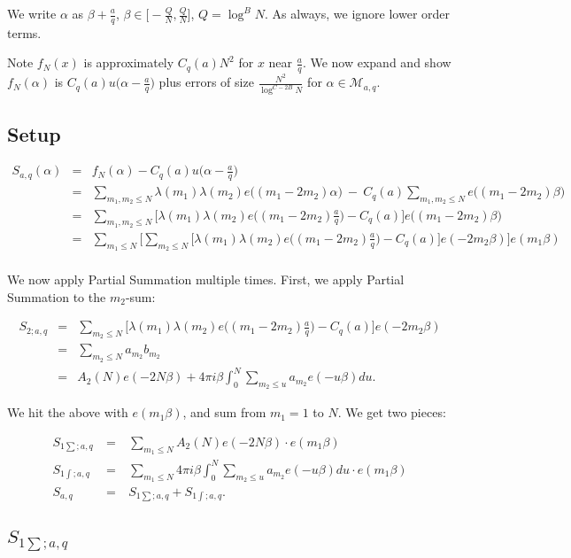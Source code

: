\documentclass[12pt,letterpaper]{report}
\newcommand\bea{\begin{eqnarray}}
\newcommand\eea{\end{eqnarray}}
\newcommand{\gl}{\lambda}
\begin{document}
We write $\alpha$ as $\beta + \frac{a}{q}$, $\beta \in \Big[
-\frac{Q}{N},\frac{Q}{N} \Big]$, $Q = \log^B N$. As always, we
ignore lower order terms.

Note $f_N(x)$ is approximately $C_q(a) N^2$ for $x$ near
$\frac{a}{q}$. We now expand and show $f_N(\alpha)$ is $C_q(a)
u\Big( \alpha - \frac{a}{q} \Big)$ plus errors of size
$\frac{N^2}{\log^{C - 2B} N}$ for $\alpha \in \mathcal{M}_{a,q}$.

\subsection{Setup}

\bea S_{a,q}(\alpha) & = & f_N(\alpha) - C_q(a) u\Big(\alpha -
\frac{a}{q}\Big) \nonumber\\ &=& \sum_{m_1,m_2 \le N} \gl(m_1)
\gl(m_2) e\Big( (m_1 - 2m_2) \alpha \Big) \ - \ C_q(a)
\sum_{m_1,m_2 \le N} e\Big( (m_1 - 2m_2)\beta\Big) \nonumber\\ &=&
\sum_{m_1,m_2 \le N} \Bigg[ \gl(m_1)\gl(m_2)e\Big(
(m_1-2m_2)\frac{a}{q}\Big) - C_q(a) \Bigg] e\Big( (m_1 -
2m_2)\beta\Big) \nonumber\\ & = &  \sum_{m_1 \le N} \Bigg[
\sum_{m_2 \le N} \Big[ \gl(m_1)\gl(m_2)e\Big( (m_1 -
2m_2)\frac{a}{q}\Big) - C_q(a) \Big] e(-2m_2 \beta) \Bigg]
e(m_1\beta) \nonumber\\ & & \eea

We now apply Partial Summation multiple times. First, we apply
Partial Summation to the $m_2$-sum:

\bea S_{2;a,q} & = & \sum_{m_2 \le N} \Big[ \gl(m_1)\gl(m_2)e\Big(
(m_1 - 2m_2)\frac{a}{q}\Big)  - C_q(a) \Big] e(-2m_2 \beta)
\nonumber\\ & = & \sum_{m_2 \le N} a_{m_2} b_{m_2} \nonumber\\ &=&
A_2(N) e(-2N\beta) + 4\pi i \beta \int_0^N \sum_{m_2 \le u}
a_{m_2} e(-u \beta) du.  \eea

We hit the above with $e(m_1 \beta)$, and sum from $m_1 = 1$ to
$N$. We get two pieces:

\bea S_{1\sum;a,q} & \ = \ & \sum_{m_1 \le N} A_2(N) e(-2N \beta)
\cdot e(m_1 \beta) \nonumber\\ S_{1\int;a,q} & \ = \ & \sum_{m_1
\le N} 4 \pi i \beta \int_0^N \sum_{m_2 \le u} a_{m_2} e(-u\beta)
du \cdot e(m_1 \beta) \nonumber\\ S_{a,q} & \ = \ & S_{1\sum;a,q}
+ S_{1\int;a,q}. \eea


\subsection{$S_{1\sum;a,q}$}
\end{document}
